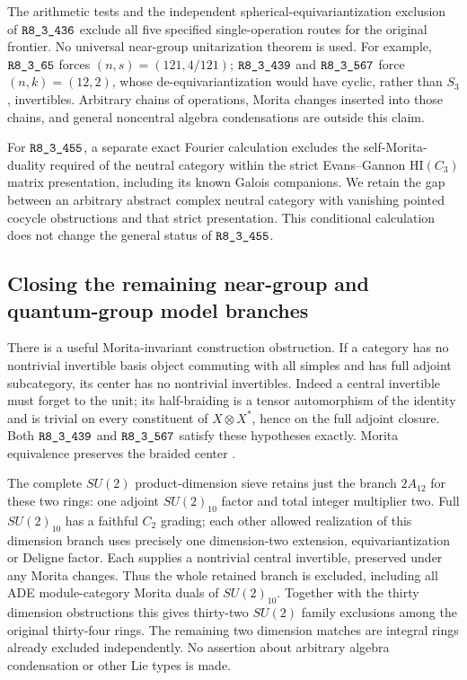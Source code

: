 The arithmetic tests and the independent spherical-equivariantization exclusion of $\sha{R8_3_436}$ exclude all five specified single-operation routes for the original frontier. No universal near-group unitarization theorem is used. For example, $\sha{R8_3_65}$ forces $(n,s)=(121,4/121)$;
$\sha{R8_3_439}$ and $\sha{R8_3_567}$ force $(n,k)=(12,2)$, whose
de-equivariantization would have cyclic, rather than $S_3$, invertibles.
Arbitrary chains of operations, Morita changes inserted into those chains,
and general noncentral algebra condensations are outside this claim.

For $\sha{R8_3_455}$, a separate exact Fourier calculation excludes the
self-Morita-duality required of the neutral category within the strict
Evans--Gannon $\mathrm{HI}(C_3)$ matrix presentation, including its known
Galois companions. We retain the gap between an arbitrary abstract complex
neutral category with vanishing pointed cocycle obstructions and that
strict presentation. This conditional calculation does not change the
general status of $\sha{R8_3_455}$.

\subsection{Closing the remaining near-group and quantum-group model branches}
\label{subsec:frontier-known-family-closure}
There is a useful Morita-invariant construction obstruction.
If a category has no nontrivial invertible basis object commuting with
all simples and has full adjoint subcategory, its center has no
nontrivial invertibles. Indeed a central invertible must forget to the
unit; its half-braiding is a tensor automorphism of the identity and is
trivial on every constituent of $X\otimes X^*$, hence on the full
adjoint closure. Both $\sha{R8_3_439}$ and $\sha{R8_3_567}$ satisfy these
hypotheses exactly. Morita equivalence preserves the braided center
\cite[Introduction]{ENOExt}.

The complete $SU(2)$ product-dimension sieve retains just the branch
$2A_{12}$ for these two rings: one adjoint $SU(2)_{10}$ factor and total
integer multiplier two. Full $SU(2)_{10}$ has a faithful $C_2$ grading;
each other allowed realization of this dimension branch uses precisely
one dimension-two extension, equivariantization or Deligne factor.
Each supplies a nontrivial central invertible, preserved under any
Morita changes. Thus the whole retained branch is excluded, including
all ADE module-category Morita duals of $SU(2)_{10}$. Together with the
thirty dimension obstructions this gives thirty-two $SU(2)$ family
exclusions among the original thirty-four rings. The remaining two
dimension matches are integral rings already excluded independently.
No assertion about arbitrary algebra condensation or other Lie types
is made.

